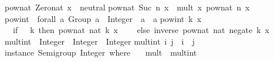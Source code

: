 \begin{isabellebody}
\begin{isamarkuptext}
pow{}nat\ Zero{}nat\ x\ {}\ neutral{}\isanewline
pow{}nat\ {}Suc\ n{}\ x\ {}\ mult\ x\ {}pow{}nat\ n\ x{}{}\isanewline
\isanewline
pow{}int\ {}{}\ forall\ a{}\ {}Group\ a{}\ {}{}\ Integer\ {}{}\ a\ {}{}\ a{}\isanewline
pow{}int\ k\ x\ {}\isanewline
\ \ {}if\ {}\ {}{}\ k\ then\ pow{}nat\ {}nat\ k{}\ x\isanewline
\ \ \ \ else\ inverse\ {}pow{}nat\ {}nat\ {}negate\ k{}{}\ x{}{}{}\isanewline
\isanewline
mult{}int\ {}{}\ Integer\ {}{}\ Integer\ {}{}\ Integer{}\isanewline
mult{}int\ i\ j\ {}\ i\ {}\ j{}\isanewline
\isanewline
instance\ Semigroup\ Integer\ where\ {}\isanewline
\ \ mult\ {}\ mult{}int{}\isanewline
{}{}\isanewline

\end{isamarkuptext}
\end{isabellebody}

